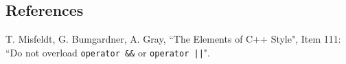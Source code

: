 \subsection{References}

T. Misfeldt, G. Bumgardner, A. Gray, ``The Elements of C++ Style", Item 111: ``Do not overload \texttt{operator \&\&} or \texttt{operator ||}".
